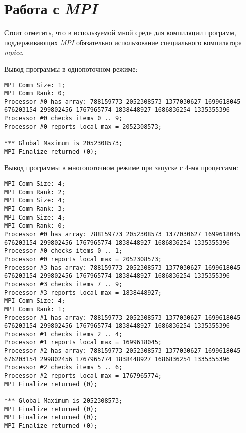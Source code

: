 \documentclass[a4paper, 12pt]{article}
\begin{document}
\section{Работа с \textit{MPI}}

Стоит отметить, что в используемой мной среде для компиляции программ, поддерживающих \textit{MPI} обязательно использование специального компилятора \textit{mpicc}.

Вывод программы в однопоточном режиме:
\begin{tiny}
\begin{verbatim}
MPI Comm Size: 1;
MPI Comm Rank: 0;
Processor #0 has array: 788159773 2052308573 1377030627 1699618045 676203154 299802456 1767965774 1838448927 1686836254 1335355396
Processor #0 checks items 0 .. 9;
Processor #0 reports local max = 2052308573;

*** Global Maximum is 2052308573;
MPI Finalize returned (0);
\end{verbatim}
\end{tiny}

Вывод программы в многопоточном режиме при запуске с 4-мя процессами:
\begin{tiny}
\begin{verbatim}
MPI Comm Size: 4;
MPI Comm Rank: 2;
MPI Comm Size: 4;
MPI Comm Rank: 3;
MPI Comm Size: 4;
MPI Comm Rank: 0;
Processor #0 has array: 788159773 2052308573 1377030627 1699618045 676203154 299802456 1767965774 1838448927 1686836254 1335355396
Processor #0 checks items 0 .. 1;
Processor #0 reports local max = 2052308573;
Processor #3 has array: 788159773 2052308573 1377030627 1699618045 676203154 299802456 1767965774 1838448927 1686836254 1335355396
Processor #3 checks items 7 .. 9;
Processor #3 reports local max = 1838448927;
MPI Comm Size: 4;
MPI Comm Rank: 1;
Processor #1 has array: 788159773 2052308573 1377030627 1699618045 676203154 299802456 1767965774 1838448927 1686836254 1335355396
Processor #1 checks items 2 .. 4;
Processor #1 reports local max = 1699618045;
Processor #2 has array: 788159773 2052308573 1377030627 1699618045 676203154 299802456 1767965774 1838448927 1686836254 1335355396
Processor #2 checks items 5 .. 6;
Processor #2 reports local max = 1767965774;
MPI Finalize returned (0);

*** Global Maximum is 2052308573;
MPI Finalize returned (0);
MPI Finalize returned (0);
MPI Finalize returned (0);
\end{verbatim}
\end{tiny}


\end{document}
